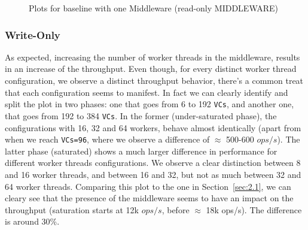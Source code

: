\documentclass[11pt,a4paper]{article}
\begin{document}
\begin{figure}[!h]
  \centering
    \caption{Plots for baseline with one Middleware (read-only MIDDLEWARE)}
  \label{fig:baseline_mw_1_mw_mw_ro}
\end{figure}

\subsubsection*{Write-Only}

As expected, increasing the number of worker threads in the middleware, results in an increase of the throughput. Even though, for every distinct worker thread configuration, we observe a distinct throughput behavior, there's a common treat that each configuration seems to manifest. In fact we can clearly identify and split the plot in two phases: one that goes from 6 to 192 \texttt{VCs}, and another one, that goes from 192 to 384 \texttt{VCs}. 
In the former (under-saturated phase), the configurations with 16, 32 and 64 workers, behave almost identically (apart from when we reach \texttt{VCs=96}, where we observe a difference of $\approx$ 500-600 $ops/s$).
The latter phase (saturated) shows a much larger difference in performance for different worker threads configurations. We observe a clear distinction between 8 and 16 worker threads, and between 16 and 32, but not as much between 32 and 64 worker threads. 
Comparing this plot to the one in Section~\ref{sec:2.1}, we can cleary see that the presence of the middleware seems to have an impact on the throughput (saturation starts at 12k $ops/s$, before $\approx$ 18k ops/s). The difference is around 30\%.
\end{document}
